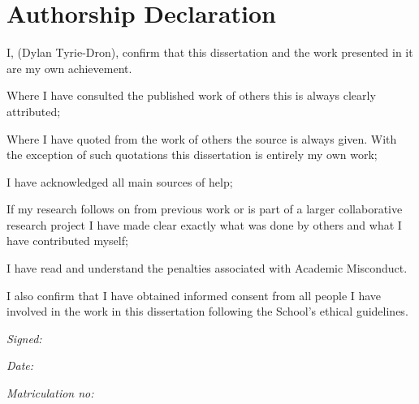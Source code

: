 
\section*{Authorship Declaration}
\vspace{0.5cm}
\begin{flushleft}
I, (Dylan Tyrie-Dron), confirm that this dissertation and the work presented in it are my own achievement.\newline

Where I have consulted the published work of others this is always clearly attributed;\newline

Where I have quoted from the work of others the source is always given. With the exception of such quotations this dissertation is entirely my own work;\newline

I have acknowledged all main sources of help; \newline

If my research follows on from previous work or is part of a larger collaborative research project I have made clear exactly what was done by others and what I have contributed myself;\newline

I have read and understand the penalties associated with Academic Misconduct.\newline

I also confirm that I have obtained informed consent from all people I have involved in the work in this dissertation following the School's ethical guidelines.\newline
\end{flushleft}

\begin{flushleft} \large
\emph{Signed:} \\
\end{flushleft}

\vspace{.5cm}

\begin{flushleft} \large
\emph{Date:} \\
\end{flushleft}

\vspace{.5cm}

\begin{flushleft} \large
\emph{Matriculation no: }  \\
\end{flushleft}